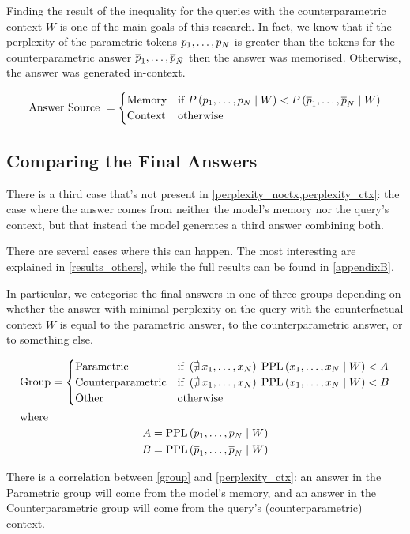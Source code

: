 Finding the result of the inequality for the queries with the counterparametric context $W$ is one of the main goals of this research.
In fact, we know that if the perplexity of the parametric tokens $p_1, \dots, p_N$ is greater than the tokens for the counterparametric answer $\overline{p}_1, \dots, \overline{p}_{\bar{N}}$ then the answer was memorised.
Otherwise, the answer was generated in-context.

\begin{equation}
	\text{Answer Source } =
	\begin{cases}
		\text{Memory} & \text{if } P \left( p_1, \dots, p_N \mid W \right) < P \left( \overline{p}_1, \dots, \overline{p}_{\bar{N}} \mid W \right) \\
		\text{Context} & \text{otherwise}
	\end{cases}
	\label{perplexity_ctx}
\end{equation}

\subsection{Comparing the Final Answers}

There is a third case that's not present in \cref{perplexity_noctx,perplexity_ctx}: the case where the answer comes from neither the model's memory nor the query's context, but that instead the model generates a third answer combining both.

There are several cases where this can happen.
The most interesting are explained in \cref{results_others}, while the full results can be found in \cref{appendixB}.

In particular, we categorise the final answers in one of three groups depending on whether the answer with minimal perplexity on the query with the counterfactual context $W$ is equal to the parametric answer, to the counterparametric answer, or to something else.

\begin{gather}
	\text{Group} =
	\begin{cases}
		\text{Parametric} & \text{if } \left( \nexists \, x_1, \dots, x_N \right) \; \text{PPL} \left( x_1, \dots, x_N \mid W \right) < A \\
		\text{Counterparametric} & \text{if } \left( \nexists \, x_1, \dots, x_N \right) \; \text{PPL} \left( x_1, \dots, x_N \mid W \right) < B \\
		\text{Other} & \text{otherwise}
	\end{cases} \label{group} \\
	\intertext{where}
	\begin{aligned}
		A = \text{PPL} \left( p_1, \dots, p_N \mid W \right) \\
		B = \text{PPL} \left( \overline{p}_1, \dots, \overline{p}_{\bar{N}} \mid W \right)
	\end{aligned} \notag{}
\end{gather}

There is a correlation between \cref{group} and \cref{perplexity_ctx}: an answer in the Parametric group will come from the model's memory, and an answer in the Counterparametric group will come from the query's (counterparametric) context.

